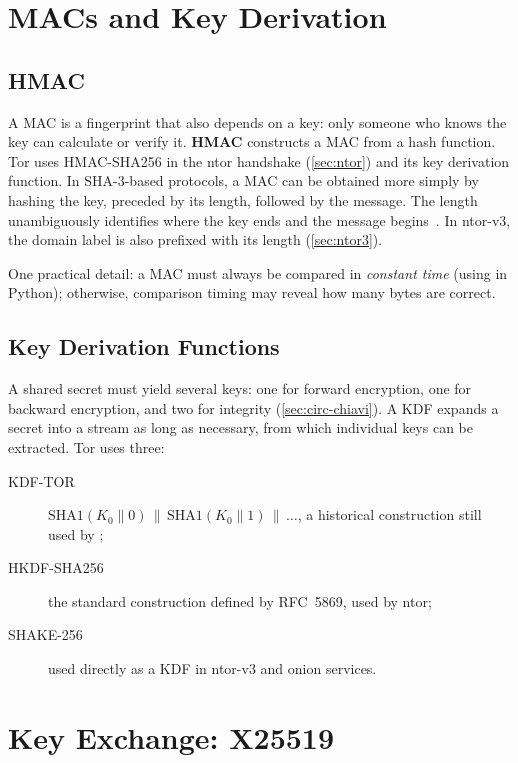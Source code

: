 \section{MACs and Key Derivation}\label{sec:cripto-mac}

\subsection{HMAC}

A MAC is a fingerprint that also depends on a key: only someone who knows the key can calculate or verify it. \textbf{HMAC} constructs a MAC from a hash function. Tor uses HMAC-SHA256 in the ntor handshake (\cref{sec:ntor}) and its key derivation function. In SHA-3-based protocols, a MAC can be obtained more simply by hashing the key, preceded by its length, followed by the message. The length unambiguously identifies where the key ends and the message begins~. In ntor-v3, the domain label is also prefixed with its length (\cref{sec:ntor3}).

One practical detail: a MAC must always be compared in \emph{constant time} (using  in Python); otherwise, comparison timing may reveal how many bytes are correct.

\subsection{Key Derivation Functions}

A shared secret must yield several keys: one for forward encryption, one for backward encryption, and two for integrity (\cref{sec:circ-chiavi}). A KDF expands a secret into a stream as long as necessary, from which individual keys can be extracted. Tor uses three:
\begin{description}
  \item[KDF-TOR] $\mathrm{SHA1}(K_0 \| 0) \,\|\, \mathrm{SHA1}(K_0 \| 1) \,\|\, \ldots$, a historical construction still used by ;
  \item[HKDF-SHA256] the standard construction defined by RFC~5869, used by ntor;
  \item[SHAKE-256] used directly as a KDF in ntor-v3 and onion services.
\end{description}

\section{Key Exchange: X25519}\label{sec:cripto-dh}

